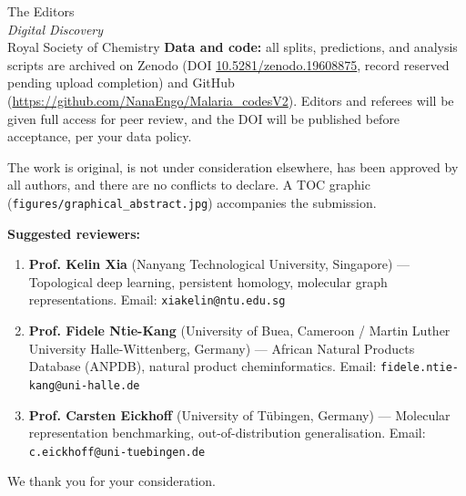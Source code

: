 \documentclass[11pt,a4paper]{letter}
\begin{document}
\begin{letter}{%
  The Editors \\
  \textit{Digital Discovery} \\
  Royal Society of Chemistry
}
\textbf{Data and code:} all splits, predictions, and analysis scripts are archived on Zenodo (DOI \href{https://doi.org/10.5281/zenodo.19608875}{10.5281/zenodo.19608875}, record reserved pending upload completion) and GitHub (\url{https://github.com/NanaEngo/Malaria_codesV2}). Editors and referees will be given full access for peer review, and the DOI will be published before acceptance, per your data policy.

The work is original, is not under consideration elsewhere, has been approved by all authors, and there are no conflicts to declare. A TOC graphic (\texttt{figures/graphical\_abstract.jpg}) accompanies the submission.

\vspace{0.4em}
\noindent\textbf{Suggested reviewers:}
\begin{enumerate}\setlength{\itemsep}{0pt}\setlength{\parskip}{0pt}
    \item \textbf{Prof. Kelin Xia} (Nanyang Technological University, Singapore) --- Topological deep learning, persistent homology, molecular graph representations. Email: \texttt{xiakelin@ntu.edu.sg}
    \item \textbf{Prof. Fidele Ntie-Kang} (University of Buea, Cameroon / Martin Luther University Halle-Wittenberg, Germany) --- African Natural Products Database (ANPDB), natural product cheminformatics. Email: \texttt{fidele.ntie-kang@uni-halle.de}
    \item \textbf{Prof. Carsten Eickhoff} (University of T\"ubingen, Germany) --- Molecular representation benchmarking, out-of-distribution generalisation. Email: \texttt{c.eickhoff@uni-tuebingen.de}
\end{enumerate}

\vspace{0.3em}
\closing{We thank you for your consideration.}

\end{letter}
\end{document}
